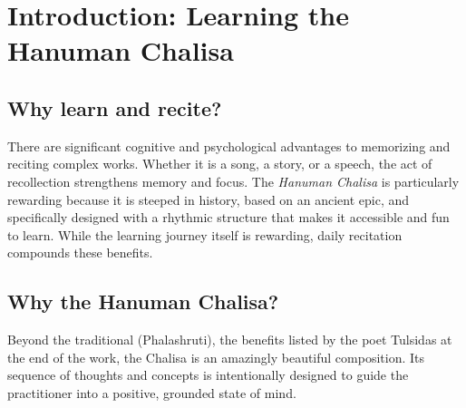 \section*{Introduction: Learning the Hanuman Chalisa}

\subsection*{Why learn and recite?} 
There are significant cognitive and psychological advantages to memorizing and reciting complex works. Whether it is a song, a story, or a speech, the act of recollection strengthens memory and focus. The \textit{Hanuman Chalisa} is particularly rewarding because it is steeped in history, based on an ancient epic, and specifically designed with a rhythmic structure that makes it accessible and fun to learn. While the learning journey itself is rewarding, daily recitation compounds these benefits.

\subsection*{Why the Hanuman Chalisa?}
Beyond the traditional  (Phalashruti), the benefits listed by the poet Tulsidas at the end of the work, the Chalisa is an amazingly beautiful composition. Its sequence of thoughts and concepts is intentionally designed to guide the practitioner into a positive, grounded state of mind.

